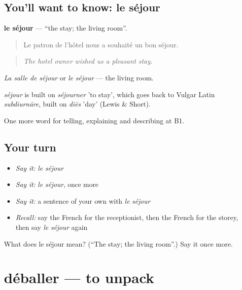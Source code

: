 \subsection*{You'll want to know: le séjour}
\textbf{le séjour} — \textquotedblleft{}the stay; the living room\textquotedblright{}.

\begin{quote}
Le patron de l'hôtel nous a souhaité un bon séjour.
\end{quote}

\begin{quote}
\emph{The hotel owner wished us a pleasant stay.}
\end{quote}

\emph{La salle de séjour} or \emph{le séjour} — the living room.

\begin{cousinweb}
\emph{séjour} is built on \emph{séjourner} 'to stay', which goes back to Vulgar Latin \emph{subdiurnāre}, built on \emph{diēs} 'day' (Lewis \& Short).
\end{cousinweb}

\begin{grammarlens}[title={What you've built}]
One more word for telling, explaining and describing at B1.
\end{grammarlens}

\subsection*{Your turn}
\begin{itemize}
\raggedright
  \item \emph{Say it:} \emph{le séjour}
  \item \emph{Say it:} \emph{le séjour}, once more
  \item \emph{Say it:} a sentence of your own with \emph{le séjour}
  \item \emph{Recall:} say the French for the receptionist, then the French for the storey, then say \emph{le séjour} again
\end{itemize}

\begin{tcolorbox}[breakable,colback=teal!4,colframe=teal!35!black,title={Before you move on}]
What does le séjour mean? (\textquotedblleft{}The stay; the living room\textquotedblright{}.) Say it once more.
\end{tcolorbox}
\section[déballer]{déballer — to unpack}

